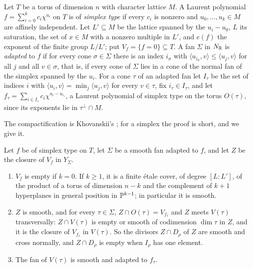 \begin{definition}\label{def:simplextype}
Let $T$ be a torus of dimension $n$ with character lattice $M$. A Laurent
polynomial $f=\sum_{i=0}^{k}c_{i}\chi^{u_{i}}$ on $T$ is of \emph{simplex
type} if every $c_{i}$ is nonzero and $u_{0},\dots,u_{k}\in M$ are affinely
independent. Let $L'\subseteq M$ be the lattice spanned by the
$u_{i}-u_{0}$, $L$ its saturation, the set of $x\in M$ with a nonzero
multiple in $L'$, and $e(f)$ the exponent of the finite group $L/L'$; put
$V_{f}=\{f=0\}\subseteq T$. A fan $\Sigma$ in $N_{\mathbb{R}}$ is \emph{adapted} to
$f$ if for every cone $\sigma\in\Sigma$ there is an index $i_{\sigma}$ with
$\langle u_{i_{\sigma}},v\rangle\le\langle u_{j},v\rangle$ for all $j$ and
all $v\in\sigma$, that is, if every cone of $\Sigma$ lies in a cone of the
normal fan of the simplex spanned by the $u_{i}$. For a cone $\tau$ of an
adapted fan let $I_{\tau}$ be the set of indices $i$ with
$\langle u_{i},v\rangle=\min_{j}\langle u_{j},v\rangle$ for every
$v\in\tau$, fix $i_{\tau}\in I_{\tau}$, and let
$f_{\tau}=\sum_{i\in I_{\tau}}c_{i}\chi^{u_{i}-u_{i_{\tau}}}$, a Laurent
polynomial of simplex type on the torus $O(\tau)$, since its exponents lie
in $\tau^{\perp}\cap M$.
\end{definition}

The compactification is Khovanskii's \cite{Kho77}; for a simplex the proof
is short, and we give it.

\begin{lemma}\label{lem:simplexchart}
Let $f$ be of simplex type on $T$, let $\Sigma$ be a smooth fan adapted to
$f$, and let $Z$ be the closure of $V_{f}$ in $Y_{\Sigma}$.
\begin{enumerate}[label=\textup{(\roman*)},leftmargin=2.6em,itemsep=2pt]
\item $V_{f}$ is empty if $k=0$. If $k\ge1$, it is a finite \'etale cover,
  of degree $[L:L']$, of the product of a torus of dimension $n-k$ and the
  complement of $k+1$ hyperplanes in general position in $\mathbb{P}^{k-1}$; in
  particular it is smooth.
\item $Z$ is smooth, and for every $\tau\in\Sigma$, $Z\cap O(\tau)=V_{f_{\tau}}$
  and $Z$ meets $V(\tau)$ transversally: $Z\cap V(\tau)$ is empty or smooth of
  codimension $\dim\tau$ in $Z$, and it is the closure of $V_{f_{\tau}}$ in
  $V(\tau)$. So the divisors $Z\cap D_{\rho}$ of $Z$ are smooth and cross
  normally, and $Z\cap D_{\rho}$ is empty when $I_{\rho}$ has one element.
\item The fan of $V(\tau)$ is smooth and adapted to $f_{\tau}$.
\end{enumerate}
\end{lemma}

